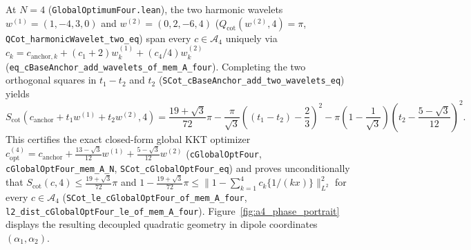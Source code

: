 \documentclass[11pt,a4paper]{article}
\theoremstyle{definition}
\begin{document}
At $N = 4$ (\texttt{Global\allowbreak Optimum\allowbreak Four.lean}), the two harmonic wavelets $w^{(1)} = (1, -4, 3, 0)$ and $w^{(2)} = (0, 2, -6, 4)$ ($Q_{\mathrm{cot}}(w^{(2)}, 4) = \pi$, \texttt{QCot\_\allowbreak harmonicWavelet\_\allowbreak two\_\allowbreak eq}) span every $c \in \mathcal{A}_4$ uniquely via $c_k = c_{\mathrm{anchor}, k} + (c_1 + 2) w_k^{(1)} + (c_4 / 4) w_k^{(2)}$ (\texttt{eq\_\allowbreak cBaseAnchor\_\allowbreak add\_\allowbreak wavelets\_\allowbreak of\_\allowbreak mem\_\allowbreak A\_\allowbreak four}). Completing the two orthogonal squares in $t_1 - t_2$ and $t_2$ (\texttt{SCot\_\allowbreak cBaseAnchor\_\allowbreak add\_\allowbreak two\_\allowbreak wavelets\_\allowbreak eq}) yields
\begin{equation}
S_{\mathrm{cot}}(c_{\mathrm{anchor}} + t_1 w^{(1)} + t_2 w^{(2)}, 4) = \frac{19 + \sqrt{3}}{72}\pi - \frac{\pi}{\sqrt{3}}\!\left((t_1 - t_2) - \frac{2}{3}\right)^{\!2} - \pi\!\left(1 - \frac{1}{\sqrt{3}}\right)\!\left(t_2 - \frac{5 - \sqrt{3}}{12}\right)^{\!2}.
\end{equation}
This certifies the exact closed-form global KKT optimizer $c_{\mathrm{opt}}^{(4)} = c_{\mathrm{anchor}} + \frac{13 - \sqrt{3}}{12} w^{(1)} + \frac{5 - \sqrt{3}}{12} w^{(2)}$ (\texttt{cGlobalOptFour}, \texttt{cGlobalOptFour\_\allowbreak mem\_\allowbreak A\_\allowbreak N}, \texttt{SCot\_\allowbreak cGlobalOptFour\_\allowbreak eq}) and proves unconditionally that $S_{\mathrm{cot}}(c, 4) \le \frac{19 + \sqrt{3}}{72}\pi$ and $1 - \frac{19 + \sqrt{3}}{72}\pi \le \|1 - \sum_{k=1}^4 c_k \{1/(kx)\}\|_{L^2}^2$ for every $c \in \mathcal{A}_4$ (\texttt{SCot\_\allowbreak le\_\allowbreak cGlobalOptFour\_\allowbreak of\_\allowbreak mem\_\allowbreak A\_\allowbreak four}, \texttt{l2\_\allowbreak dist\_\allowbreak cGlobalOptFour\_\allowbreak le\_\allowbreak of\_\allowbreak mem\_\allowbreak A\_\allowbreak four}). Figure~\ref{fig:a4_phase_portrait} displays the resulting decoupled quadratic geometry in dipole coordinates $(\alpha_1, \alpha_2)$.
\end{document}
